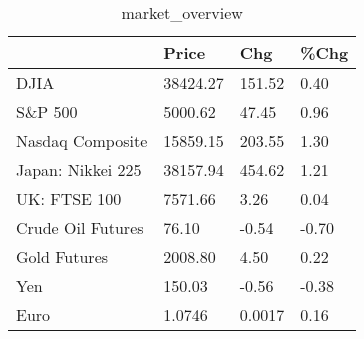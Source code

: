 \documentclass{article}%
\begin{document}
%


\begin{table}[htbp]%
\caption{market\_overview}%
\centering%
\begin{adjustbox}{width=1\textwidth}%
\begin{tabular}{llll}
\toprule
                  &    Price &    Chg &  \%Chg \\
\midrule
             DJIA & 38424.27 & 151.52 &  0.40 \\
          S\&P 500 &  5000.62 &  47.45 &  0.96 \\
 Nasdaq Composite & 15859.15 & 203.55 &  1.30 \\
Japan: Nikkei 225 & 38157.94 & 454.62 &  1.21 \\
     UK: FTSE 100 &  7571.66 &   3.26 &  0.04 \\
Crude Oil Futures &    76.10 &  -0.54 & -0.70 \\
     Gold Futures &  2008.80 &   4.50 &  0.22 \\
              Yen &   150.03 &  -0.56 & -0.38 \\
             Euro &   1.0746 & 0.0017 &  0.16 \\
\bottomrule
\end{tabular}
%
\end{adjustbox}%
\end{table}

%
\end{document}
